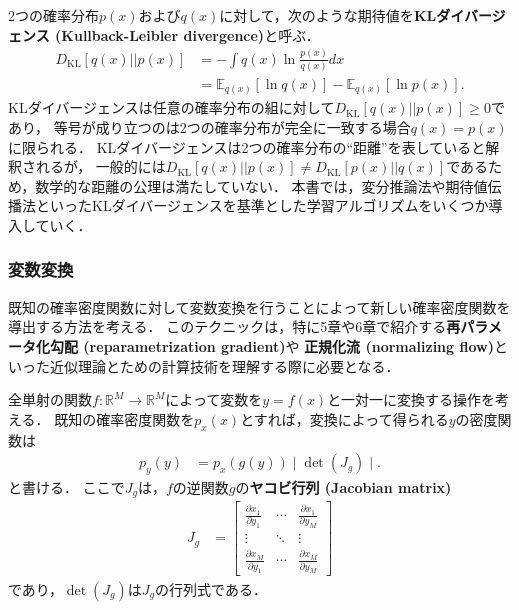 \documentclass[11pt,a4paper]{jsarticle}
\numberwithin{equation}{section}
\begin{document}
2つの確率分布$p(x)$および$q(x)$に対して，次のような期待値を\textbf{KLダイバージェンス (Kullback-Leibler divergence)}と呼ぶ．
\begin{align}
D_{\mathrm{KL}} [q(x) || p(x)]
& =
- \int q(x) \ln \frac{p(x)}{q(x)} dx \nonumber \\
& =
\mathbb{E}_{q(x)} [\ln q(x)] - \mathbb{E}_{q(x)} [\ln p(x)].
\end{align}
KLダイバージェンスは任意の確率分布の組に対して$D_{\mathrm{KL}} [q(x) || p(x)] \geq 0$であり，
等号が成り立つのは2つの確率分布が完全に一致する場合$q(x) = p(x)$に限られる．
KLダイバージェンスは2つの確率分布の``距離''を表していると解釈されるが，
一般的には$D_{\mathrm{KL}} [q(x) || p(x)] \neq D_{\mathrm{KL}} [p(x) || q(x)]$であるため，数学的な距離の公理は満たしていない．
本書では，変分推論法や期待値伝播法といったKLダイバージェンスを基準とした学習アルゴリズムをいくつか導入していく．

\subsubsection{変数変換}
既知の確率密度関数に対して変数変換を行うことによって新しい確率密度関数を導出する方法を考える．
このテクニックは，特に5章や6章で紹介する\textbf{再パラメータ化勾配 (reparametrization gradient)}や
\textbf{正規化流 (normalizing flow)}といった近似理論とための計算技術を理解する際に必要となる．

全単射の関数$f: \mathbb{R}^M \to \mathbb{R}^M$によって変数を$y = f(x)$と一対一に変換する操作を考える．
既知の確率密度関数を$p_x (x)$とすれば，変換によって得られる$y$の密度関数は
\begin{align}
p_y (y)
& =
p_x (g(y)) \mid \det (J_g) \mid.
\end{align}
と書ける．
ここで$J_g$は，$f$の逆関数$g$の\textbf{ヤコビ行列 (Jacobian matrix)}
\begin{align}
J_g
& =
\begin{bmatrix}
\displaystyle \frac{\partial x_1}{\partial y_1} & \cdots & \displaystyle \frac{\partial x_1}{\partial y_M} \\
\vdots & \ddots & \vdots \\
\displaystyle \frac{\partial x_M}{\partial y_1} & \cdots & \displaystyle \frac{\partial x_M}{\partial y_M}
\end{bmatrix}
\end{align}
であり，$\det (J_g)$は$J_g$の行列式である．
\end{document}
